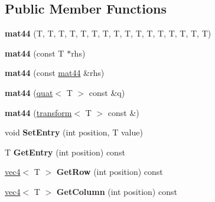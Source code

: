 \subsection*{Public Member Functions}
\begin{DoxyCompactItemize}
\item 
\hypertarget{classmath_1_1mat44_a1130dbd465b9d6d47fb5ee2f12ed23f0}{
{\bfseries mat44} (T, T, T, T, T, T, T, T, T, T, T, T, T, T, T, T)}
\label{classmath_1_1mat44_a1130dbd465b9d6d47fb5ee2f12ed23f0}

\item 
\hypertarget{classmath_1_1mat44_ad21b555ef817572be46000ece4b87a1a}{
{\bfseries mat44} (const T $\ast$rhs)}
\label{classmath_1_1mat44_ad21b555ef817572be46000ece4b87a1a}

\item 
\hypertarget{classmath_1_1mat44_a9d291f8d0a8f45914266395a59747c6b}{
{\bfseries mat44} (const \hyperlink{classmath_1_1mat44}{mat44} \&rhs)}
\label{classmath_1_1mat44_a9d291f8d0a8f45914266395a59747c6b}

\item 
\hypertarget{classmath_1_1mat44_a0214f4c0946a0c322a3873348ba260ba}{
{\bfseries mat44} (\hyperlink{classmath_1_1quat}{quat}$<$ T $>$ const \&q)}
\label{classmath_1_1mat44_a0214f4c0946a0c322a3873348ba260ba}

\item 
\hypertarget{classmath_1_1mat44_a33f5451d462044844a2e581541fa80c0}{
{\bfseries mat44} (\hyperlink{classmath_1_1transform}{transform}$<$ T $>$ const \&)}
\label{classmath_1_1mat44_a33f5451d462044844a2e581541fa80c0}

\item 
\hypertarget{classmath_1_1mat44_a2ccdbfc7e205429f50c98babcb1187d8}{
void {\bfseries SetEntry} (int position, T value)}
\label{classmath_1_1mat44_a2ccdbfc7e205429f50c98babcb1187d8}

\item 
\hypertarget{classmath_1_1mat44_a9533b8b54e9a0d7fed4a63645348f84b}{
T {\bfseries GetEntry} (int position) const }
\label{classmath_1_1mat44_a9533b8b54e9a0d7fed4a63645348f84b}

\item 
\hypertarget{classmath_1_1mat44_a604cea86b7b71cd14ad28f534886eec3}{
\hyperlink{classmath_1_1vec4}{vec4}$<$ T $>$ {\bfseries GetRow} (int position) const }
\label{classmath_1_1mat44_a604cea86b7b71cd14ad28f534886eec3}

\item 
\hypertarget{classmath_1_1mat44_aaf0e6b80e5b56bfcdaf4321054935249}{
\hyperlink{classmath_1_1vec4}{vec4}$<$ T $>$ {\bfseries GetColumn} (int position) const }
\label{classmath_1_1mat44_aaf0e6b80e5b56bfcdaf4321054935249}


\end{DoxyCompactItemize}
